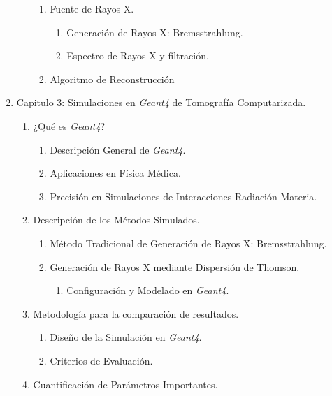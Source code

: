 \begin{enumerate}
\begin{enumerate}
        \begin{enumerate}
            \item Fuente de Rayos X.
            \begin{enumerate}
                \item Generación de Rayos X: Bremsstrahlung.
                \item Espectro de Rayos X y filtración.
            \end{enumerate}
            \item Algoritmo de Reconstrucción
        \end{enumerate}
    \end{enumerate}
    \item Capitulo 3: Simulaciones en \textit{Geant4} de Tomografía Computarizada.
    \begin{enumerate}
        \item ¿Qué es \textit{Geant4}?
        \begin{enumerate}
            \item Descripción General de \textit{Geant4}.
            \item Aplicaciones en Física Médica.
            \item Precisión en Simulaciones de Interacciones Radiación-Materia.
        \end{enumerate}
        \item Descripción de los Métodos Simulados.
        \begin{enumerate}
            \item Método Tradicional de Generación de Rayos X: Bremsstrahlung.
            \item Generación de Rayos X mediante Dispersión de Thomson.
            \begin{enumerate}
                \item Configuración y Modelado en \textit{Geant4}.
            \end{enumerate}
        \end{enumerate}
        \item Metodología para la comparación de resultados.
        \begin{enumerate}
            \item Diseño de la Simulación en \textit{Geant4}.
            \item Criterios de Evaluación.
        \end{enumerate}
        \item Cuantificación de Parámetros Importantes.

\end{enumerate}
\end{enumerate}
